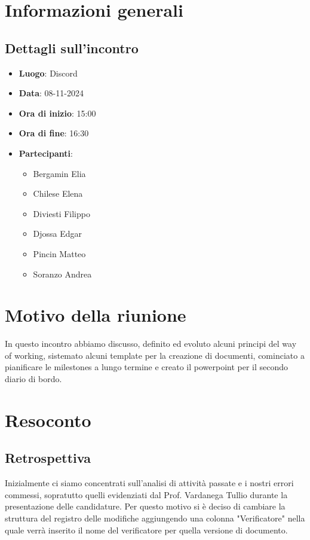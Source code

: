 \section{Informazioni generali}
\subsection{Dettagli sull'incontro}
\begin{itemize}
    \item \textbf{Luogo}: Discord
    \item \textbf{Data}: 08-11-2024
    \item \textbf{Ora di inizio}: 15:00
    \item \textbf{Ora di fine}: 16:30
    \item \textbf{Partecipanti}: 
    \begin{itemize}
        \item Bergamin Elia
        \item Chilese Elena
        \item Diviesti Filippo
        \item Djossa Edgar
        \item Pincin Matteo 
        \item Soranzo Andrea  
    \end{itemize}
\end{itemize}

\section{Motivo della riunione}
In questo incontro abbiamo discusso, definito ed evoluto alcuni principi del way of working, sistemato alcuni template per la creazione di documenti,
cominciato a pianificare le milestones a lungo termine e creato il powerpoint per il secondo diario di bordo.

\section{Resoconto}
\subsection{Retrospettiva}
Inizialmente ci siamo concentrati sull'analisi di attività passate e i nostri errori commessi, sopratutto quelli evidenziati dal Prof. Vardanega Tullio durante la presentazione
delle candidature. Per questo motivo si è deciso di cambiare la struttura del registro delle modifiche aggiungendo una colonna "Verificatore" nella quale verrà inserito il nome del verificatore per quella versione di documento.

